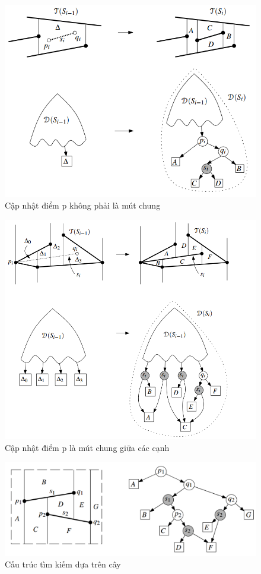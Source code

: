 \documentclass[a4paper,12pt]{report}
\begin{document}
\begin{figure}[H]
\centering
\includegraphics[scale=0.4]{updateT.png}
\caption{Cập nhật điểm p không phải là mút chung}
\label{object_pic}
\end{figure}

\begin{figure}[H]
\centering
\includegraphics[scale=0.4]{updateT2.png}
\caption{Cập nhật điểm p là mút chung giữa các cạnh}
\label{object_pic}
\end{figure}
\begin{figure}[H]
\centering
\includegraphics[scale=0.4]{trmap3.png}
\caption{Cấu trúc tìm kiếm dựa trên cây}
\label{object_pic}
\end{figure}
\end{document}
